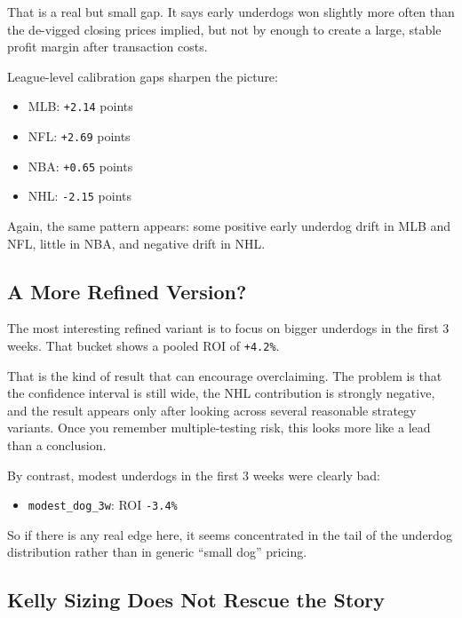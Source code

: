 \documentclass[
  letterpaper,
  DIV=11,
  numbers=noendperiod]{scrartcl}
\providecommand{\tightlist}{%
  \setlength{\itemsep}{0pt}\setlength{\parskip}{0pt}}\usepackage{longtable,booktabs,array}
\begin{document}
That is a real but small gap. It says early underdogs won slightly more
often than the de-vigged closing prices implied, but not by enough to
create a large, stable profit margin after transaction costs.

League-level calibration gaps sharpen the picture:

\begin{itemize}
\tightlist
\item
  MLB: \texttt{+2.14} points
\item
  NFL: \texttt{+2.69} points
\item
  NBA: \texttt{+0.65} points
\item
  NHL: \texttt{-2.15} points
\end{itemize}

Again, the same pattern appears: some positive early underdog drift in
MLB and NFL, little in NBA, and negative drift in NHL.

\subsection{A More Refined Version?}\label{a-more-refined-version}

The most interesting refined variant is to focus on bigger underdogs in
the first 3 weeks. That bucket shows a pooled ROI of \texttt{+4.2\%}.

That is the kind of result that can encourage overclaiming. The problem
is that the confidence interval is still wide, the NHL contribution is
strongly negative, and the result appears only after looking across
several reasonable strategy variants. Once you remember multiple-testing
risk, this looks more like a lead than a conclusion.

By contrast, modest underdogs in the first 3 weeks were clearly bad:

\begin{itemize}
\tightlist
\item
  \texttt{modest\_dog\_3w}: ROI \texttt{-3.4\%}
\end{itemize}

So if there is any real edge here, it seems concentrated in the tail of
the underdog distribution rather than in generic ``small dog'' pricing.

\subsection{Kelly Sizing Does Not Rescue the
Story}\label{kelly-sizing-does-not-rescue-the-story}
\end{document}

